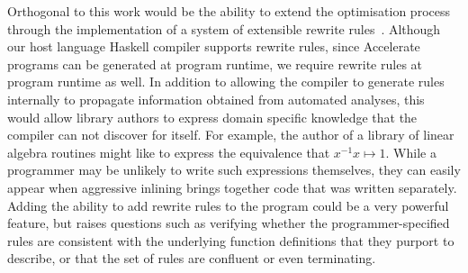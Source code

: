 Orthogonal to this work would be the ability to extend the optimisation process
through the implementation of a system of extensible rewrite
rules~\cite{Jones:2001wm}. Although our host language Haskell compiler supports
rewrite rules, since Accelerate programs can be generated at program runtime, we
require rewrite rules at program runtime as well. In addition to allowing the
compiler to generate rules internally to propagate information obtained from
automated analyses, this would allow library authors to express domain specific
knowledge that the compiler can not discover for itself. For example, the author
of a library of linear algebra routines might like to express the equivalence
that $x^{-1}x \mapsto 1$.
While a programmer may be unlikely to
write such expressions themselves, they can easily appear when aggressive
inlining brings together code that was written separately. Adding the ability to
add rewrite rules to the program could be a very powerful feature, but raises
questions such as verifying whether the programmer-specified rules are
consistent with the underlying function definitions that they purport to
describe, or that the set of rules are confluent or even terminating.


